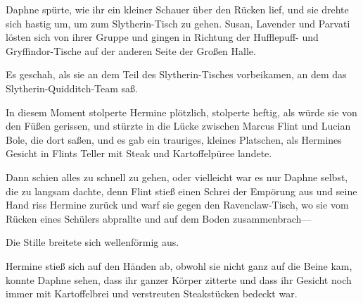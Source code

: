Daphne spürte, wie ihr ein kleiner Schauer über den Rücken lief, und sie drehte sich hastig um, um zum Slytherin-Tisch zu gehen. Susan, Lavender und Parvati lösten sich von ihrer Gruppe und gingen in Richtung der Hufflepuff- und Gryffindor-Tische auf der anderen Seite der Großen Halle.

Es geschah, als sie an dem Teil des Slytherin-Tisches vorbeikamen, an dem das Slytherin-Quidditch-Team saß.

In diesem Moment stolperte Hermine plötzlich, stolperte heftig, als würde sie von den Füßen gerissen, und stürzte in die Lücke zwischen Marcus Flint und Lucian Bole, die dort saßen, und es gab ein trauriges, kleines Platschen, als Hermines Gesicht in Flints Teller mit Steak und Kartoffelpüree landete.

Dann schien alles zu schnell zu gehen, oder vielleicht war es nur Daphne selbst, die zu langsam dachte, denn Flint stieß einen Schrei der Empörung aus und seine Hand riss Hermine zurück und warf sie gegen den Ravenclaw-Tisch, wo sie vom Rücken eines Schülers abprallte und auf dem Boden zusammenbrach—

Die Stille breitete sich wellenförmig aus.

Hermine stieß sich auf den Händen ab, obwohl sie nicht ganz auf die Beine kam, konnte Daphne sehen, dass ihr ganzer Körper zitterte und dass ihr Gesicht noch immer mit Kartoffelbrei und verstreuten Steakstücken bedeckt war.

